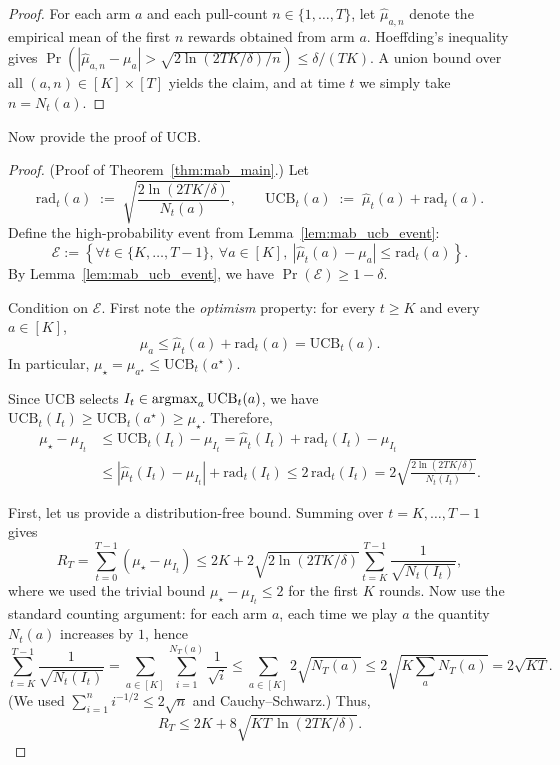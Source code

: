 \begin{proof} For each arm $a$ and each pull-count $n\in\{1,\dots,T\}$, let
$\widehat\mu_{a,n}$ denote the empirical mean of the first $n$ rewards obtained from arm $a$.
Hoeffding's inequality gives
$\Pr(|\widehat\mu_{a,n}-\mu_a|>\sqrt{2\ln(2TK/\delta)/n})\le \delta/(TK)$.
A union bound over all $(a,n)\in[K]\times[T]$ yields the claim, and at time $t$
we simply take $n=N_t(a)$. 
\end{proof}

Now provide the proof of UCB.

\begin{proof} (Proof of Theorem~\ref{thm:mab_main}.)
Let
\[
\mathrm{rad}_t(a) \;:=\; \sqrt{\frac{2\ln(2TK/\delta)}{N_t(a)}},
\qquad
\mathrm{UCB}_t(a) \;:=\; \widehat\mu_t(a) + \mathrm{rad}_t(a).
\]
Define the high-probability event from Lemma~\ref{lem:mab_ucb_event}:
\[
\mathcal{E}
:=\left\{
\forall t\in\{K,\dots,T-1\},\ \forall a\in[K],\ 
|\widehat\mu_t(a)-\mu_a|\le \mathrm{rad}_t(a)
\right\}.
\]
By Lemma~\ref{lem:mab_ucb_event}, we have $\Pr(\mathcal{E})\ge 1-\delta$.

Condition on $\mathcal{E}$. First note the \emph{optimism} property: for every
$t\ge K$ and every $a\in[K]$,
\[
\mu_a \le \widehat\mu_t(a) + \mathrm{rad}_t(a) = \mathrm{UCB}_t(a).
\]
In particular, $\mu_\star=\mu_{a^\star}\le \mathrm{UCB}_t(a^\star)$.

Since UCB selects $I_t\in\operatorname*{argmax}_{a}\mathrm{UCB}_t(a)$, we have
$\mathrm{UCB}_t(I_t)\ge \mathrm{UCB}_t(a^\star)\ge \mu_\star$. Therefore,
\begin{align*}
\mu_\star - \mu_{I_t}
&\le \mathrm{UCB}_t(I_t) - \mu_{I_t}
= \widehat\mu_t(I_t) + \mathrm{rad}_t(I_t) - \mu_{I_t}\\
&\le |\widehat\mu_t(I_t)-\mu_{I_t}| + \mathrm{rad}_t(I_t)
\le 2\,\mathrm{rad}_t(I_t)
= 2\sqrt{\frac{2\ln(2TK/\delta)}{N_t(I_t)}}.
\end{align*}

First, let us provide a distribution-free bound.
Summing over $t=K,\dots,T-1$ gives
\[
R_T
= \sum_{t=0}^{T-1}(\mu_\star-\mu_{I_t})
\le 2K + 2\sqrt{2\ln(2TK/\delta)}\sum_{t=K}^{T-1}\frac{1}{\sqrt{N_t(I_t)}},
\]
where we used the trivial bound $\mu_\star-\mu_{I_t}\le 2$ for the first $K$ rounds.
Now use the standard counting argument: for each arm $a$,
each time we play $a$ the quantity $N_t(a)$ increases by $1$, hence
\[
\sum_{t=K}^{T-1}\frac{1}{\sqrt{N_t(I_t)}}
= \sum_{a\in[K]}\sum_{i=1}^{N_T(a)}\frac{1}{\sqrt{i}}
\le \sum_{a\in[K]} 2\sqrt{N_T(a)}
\le 2\sqrt{K\sum_{a}N_T(a)}
= 2\sqrt{KT}.
\]
(We used $\sum_{i=1}^n i^{-1/2}\le 2\sqrt{n}$ and Cauchy--Schwarz.)
Thus,
\[
R_T \le 2K + 8\sqrt{KT\,\ln(2TK/\delta)}.
\]


\end{proof}
